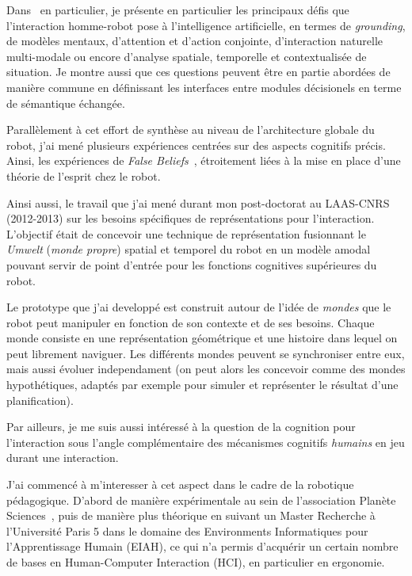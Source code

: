 \documentclass[a4paper]{article}
\begin{document}
Dans~\cite{lemaignan2014human} en particulier, je présente en particulier les
principaux défis que l'interaction homme-robot pose à l'intelligence
artificielle, en termes de \emph{grounding}, de modèles mentaux, d'attention et
d'action conjointe, d'interaction naturelle multi-modale ou encore d'analyse
spatiale, temporelle et contextualisée de situation. Je montre aussi que ces
questions peuvent être en partie abordées de manière commune en définissant les
interfaces entre modules décisionels en terme de sémantique échangée.

Parallèlement à cet effort de synthèse au niveau de l'architecture globale du
robot, j'ai mené plusieurs expériences centrées sur des aspects cognitifs
précis. Ainsi, les expériences de \emph{False Beliefs}~\cite{Warnier2012a},
étroitement liées à la mise en place d'une théorie de l'esprit chez le robot.

Ainsi aussi, le travail que j'ai mené durant mon post-doctorat au LAAS-CNRS
(2012-2013) sur les besoins spécifiques de représentations pour l'interaction.
L'objectif était de concevoir une technique de représentation fusionnant le
\emph{Umwelt} (\emph{monde propre}) spatial et temporel du robot en un modèle
amodal pouvant servir de point d'entrée pour les fonctions cognitives
supérieures du robot.

Le prototype que j'ai developpé est construit autour de l'idée de \emph{mondes}
que le robot peut manipuler en fonction de son contexte et de ses besoins.
Chaque monde consiste en une représentation géométrique et une histoire dans
lequel on peut librement naviguer. Les différents mondes peuvent se synchroniser
entre eux, mais aussi évoluer independament (on peut alors les concevoir comme
des mondes hypothétiques, adaptés par exemple pour simuler et représenter le
résultat d'une planification).

Par ailleurs, je me suis aussi intéressé à la question de la cognition pour
l'interaction sous l'angle complémentaire des mécanismes cognitifs
\emph{humains} en jeu durant une interaction.

J'ai commencé à m'interesser à cet aspect dans le cadre de la robotique
pédagogique. D'abord de manière expérimentale au sein de l'association Planète
Sciences~\cite{stinckwich2007squeakbot}, puis de manière plus théorique en
suivant un Master Recherche à l'Université Paris 5 dans le domaine des
Environments Informatiques pour l'Apprentissage Humain (EIAH), ce qui n'a permis
d'acquérir un certain nombre de bases en Human-Computer Interaction (HCI), en
particulier en ergonomie.
\end{document}

